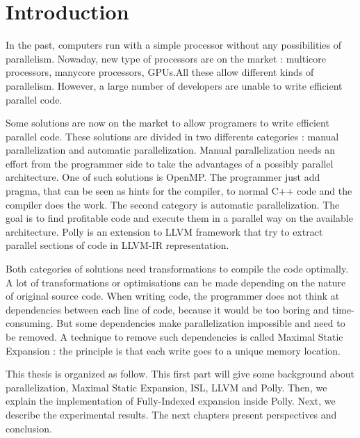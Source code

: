 \chapter*{Introduction}\label{ch:Intro}

In the past, computers run with a simple processor without any possibilities of parallelism. Nowaday, new type of processors are on the market : multicore processors, manycore processors, GPUs.All these allow different kinds of parallelism. However, a large number of developers are unable to write efficient parallel code.

Some solutions are now on the market to allow programers to write efficient parallel code. These solutions are divided in two differents categories : manual parallelization and automatic parallelization. Manual parallelization needs an effort from the programmer side to take the advantages of a possibly parallel architecture. One of such solutions is OpenMP. The programmer just add pragma, that can be seen as hints for the compiler, to normal C++ code and the compiler does the work. The second category is automatic parallelization. The goal is to find profitable code and execute them in a parallel way on the available architecture. Polly is an extension to LLVM framework that try to extract parallel sections of code in LLVM-IR representation.

Both categories of solutions need transformations to compile the code optimally. A lot of transformations or optimisations can be made depending on the nature of original source code. When writing code, the programmer does not think at dependencies between each line of code, because it would be too boring and time-consuming. But some dependencies make parallelization impossible and need to be removed. A technique to remove such dependencies is called Maximal Static Expansion : the principle is that each write goes to a unique memory location.

This thesis is organized as follow. This first part will give some background about parallelization, Maximal Static Expansion, ISL, LLVM and Polly. Then, we explain the implementation of Fully-Indexed expansion inside Polly. Next, we describe the experimental results. The next chapters present perspectives and conclusion.

